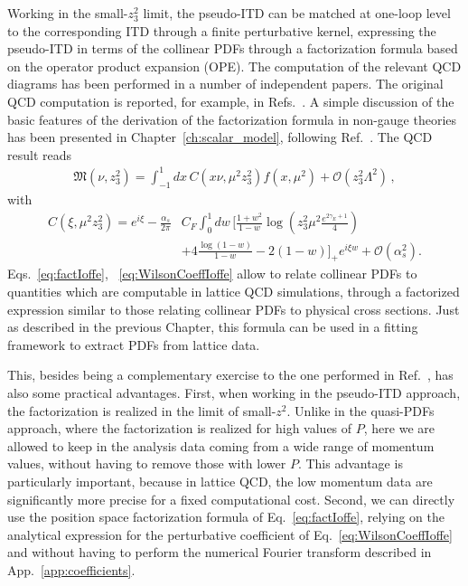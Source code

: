 Working in the small-$z_3^2$ limit, the pseudo-ITD can be matched at one-loop level to the corresponding ITD
through a finite perturbative kernel, expressing the pseudo-ITD in terms of the collinear PDFs through a factorization formula
based on the operator product expansion (OPE).  
The computation of the relevant QCD diagrams has been performed in a number of independent papers.
The original QCD computation is reported, for example, 
in Refs.~\cite{Radyushkin:2017lvu, Radyushkin:2016hsy, Izubuchi:2018srq, Ji:2017rah}.
A simple discussion of the basic features of  the derivation of the factorization formula in non-gauge 
theories has been presented in Chapter~\ref{ch:scalar_model}, following Ref.~\cite{DelDebbio:2020cbz}.
The QCD result reads
\begin{align}
	\label{eq:factIoffe}
	\mathfrak{M}\left(\nu, z_3^2\right) = \int_{-1}^{1} dx\,C\left(x\nu,\mu^2 z_3^2\right)f\left(x,\mu^2\right) + \mathcal{O}\left(z_3^2\Lambda^2\right)\,, 
\end{align}
with
\begin{align}
	\label{eq:WilsonCoeffIoffe}
	C\left(\xi,\mu^2 z_3^2\right) 
	= e^{i\xi} \nonumber -\frac{\alpha_s}{2\pi}& C_F \int_0^1 dw \, \biggl[\frac{1+w^2}{1-w} \log\left(z_3^2\mu^2\frac{e^{2\gamma_E + 1}}{4}\right) \nonumber \\
	&+4\frac{\log\left(1-w\right)}{1-w} -2\left(1-w\right)\biggr]_+ e^{i \xi w} + \mathcal{O}\left(\alpha_s^2\right).
\end{align}
Eqs.~\eqref{eq:factIoffe}, ~\eqref{eq:WilsonCoeffIoffe} allow to relate collinear PDFs to quantities
which are computable in lattice QCD simulations, through a factorized expression similar to those
relating collinear PDFs to physical cross sections. Just as described in the previous Chapter, 
this formula can be used in a fitting framework to extract PDFs from lattice data.

%
This, besides being a complementary exercise to the one performed in Ref.~\cite{Cichy2019}, has also some
practical advantages. First, when working in the pseudo-ITD approach, the factorization is realized in the limit of small-$z^2$.
Unlike in the quasi-PDFs approach, where the factorization is realized for high values of $P$,
here we are allowed to keep in the analysis data coming from a wide range of momentum values, 
without having to remove those with lower $P$.
This advantage is particularly important, because in lattice QCD, the low momentum data are significantly more precise for a fixed computational cost.
Second, we can directly use the position space factorization formula of Eq.~\eqref{eq:factIoffe}, relying on the analytical
expression for the perturbative coefficient of Eq.~\eqref{eq:WilsonCoeffIoffe} and without having
to perform the numerical Fourier transform described in App.~\ref{app:coefficients}.

